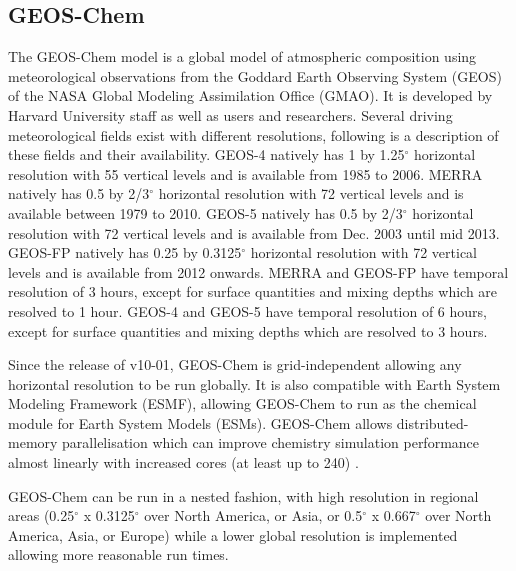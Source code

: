 \subsection{GEOS-Chem}

The GEOS-Chem model is a global model of atmospheric composition using meteorological observations from the Goddard Earth Observing System (GEOS) of the NASA Global Modeling Assimilation Office (GMAO). 
It is developed by Harvard University staff as well as users and researchers. 
Several driving meteorological fields exist with different resolutions, following is a description of these fields and their availability. 
GEOS-4 natively has 1 by 1.25$^\circ$ horizontal resolution with 55 vertical levels and is available from 1985 to 2006. 
MERRA natively has 0.5 by 2/3$^\circ$ horizontal resolution with 72 vertical levels and is available between 1979 to 2010.
GEOS-5 natively has 0.5 by 2/3$^\circ$ horizontal resolution with 72 vertical levels and is available from Dec. 2003 until mid 2013.
GEOS-FP natively has 0.25 by 0.3125$^\circ$ horizontal resolution with 72 vertical levels and is available from 2012 onwards.
MERRA and GEOS-FP have temporal resolution of 3 hours, except for surface quantities and mixing depths which are resolved to 1 hour.
GEOS-4 and GEOS-5 have temporal resolution of 6 hours, except for surface quantities and mixing depths which are resolved to 3 hours.

Since the release of v10-01, GEOS-Chem is grid-independent allowing any horizontal resolution to be run globally. 
It is also compatible with Earth System Modeling Framework (ESMF), allowing GEOS-Chem to run as the chemical module for Earth System Models (ESMs). 
GEOS-Chem allows distributed-memory parallelisation which can improve chemistry simulation performance almost linearly with increased cores (at least up to 240) \cite{Long_2015}.

GEOS-Chem can be run in a nested fashion, with high resolution in regional areas (0.25$^{\circ}$ x 0.3125$^{\circ}$ over North America, or Asia, or  0.5$^{\circ}$ x 0.667$^{\circ}$ over North America, Asia, or Europe) while a lower global resolution is implemented allowing more reasonable run times.
  
  
  